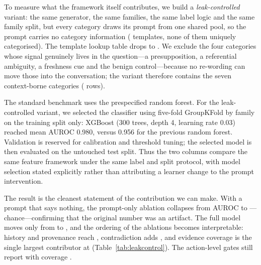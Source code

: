 \documentclass[conference,a4paper]{IEEEtran}
\begin{document}
To measure what the framework itself contributes, we build a
\emph{leak-controlled} variant: the same generator, the same families, the
same label logic and the same family split, but every category draws its
prompt from one shared pool, so the prompt carries no category information
(\lctemplates{} templates, none of them uniquely categorised). The
template lookup table drops to \lcleakauc{}. We exclude the four categories
whose signal genuinely lives in the question---a presupposition, a
referential ambiguity, a freshness cue and the benign control---because no
re-wording can move those into the conversation; the variant therefore
contains the seven context-borne categories (\lcnrows{} rows).

The standard benchmark uses the prespecified random forest. For the
leak-controlled variant, we selected the classifier using five-fold
GroupKFold by family on the training split only: XGBoost (300 trees, depth 4,
learning rate 0.03) reached mean AUROC 0.980, versus 0.956 for the previous
random forest. Validation is reserved for calibration and threshold tuning;
the selected model is then evaluated on the untouched test split. Thus the
two columns compare the same feature framework under the same label and
split protocol, with model selection stated explicitly rather than
attributing a learner change to the prompt intervention.

The result is the cleanest statement of the contribution we can make.
With a prompt that says nothing, the prompt-only ablation collapses from
AUROC \promptauroc{} to \lcprompt{}---chance---confirming that the original
number was an artifact. The full model moves only from \auroc{} to
\lcauc{}, and the ordering of the ablations becomes interpretable:
history and provenance reach \lchistory{}, contradiction adds
\lccontradiction{}, and evidence coverage is the single largest
contributor at \lcevidence{} (Table~\ref{tab:leakcontrol}). The action-level
gates still report \lccoverageok{} with coverage \lccoverage.
\end{document}
